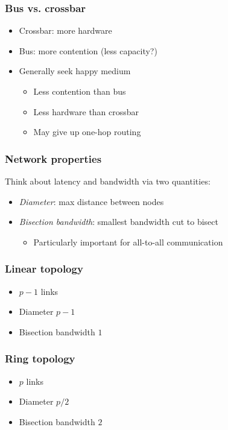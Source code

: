 \documentclass{beamer}
\begin{document}
\begin{frame}
  \frametitle{Bus vs. crossbar}

  \begin{itemize}
  \item Crossbar: more hardware
  \item Bus: more contention (less capacity?)
  \item Generally seek happy medium
    \begin{itemize}
    \item Less contention than bus
    \item Less hardware than crossbar
    \item May give up one-hop routing
    \end{itemize}
  \end{itemize}
\end{frame}


\begin{frame}
  \frametitle{Network properties}
  
  Think about latency and bandwidth via two quantities:
  \begin{itemize}
  \item {\em Diameter}: max distance between nodes
  \item {\em Bisection bandwidth}: smallest bandwidth cut to bisect
    \begin{itemize}
    \item Particularly important for all-to-all communication
    \end{itemize}
  \end{itemize}
  
\end{frame}


\begin{frame}
  \frametitle{Linear topology}
  
  \begin{center}
  
  \end{center}
  \begin{itemize}
  \item $p-1$ links
  \item Diameter $p-1$
  \item Bisection bandwidth $1$
  \end{itemize}
\end{frame}


\begin{frame}
  \frametitle{Ring topology}

  \begin{center}
  
  \end{center}

  \begin{itemize}
  \item $p$ links
  \item Diameter $p/2$
  \item Bisection bandwidth $2$
  \end{itemize}

\end{frame}
\end{document}
